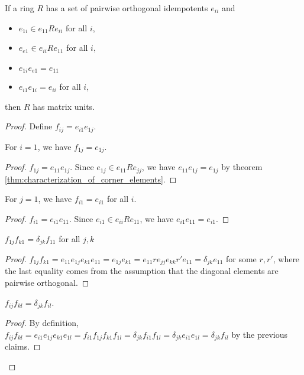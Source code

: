 \begin{theorem}
  \label{thm:criterion_for_matrix_units}
  \leanok
  If a ring $R$ has a set of pairwise orthogonal idempotents $e_{ii}$ and
  \begin{itemize}
    \item $e_{1i} \in e_{11}Re_{ii}$ for all $i$,
    \item $e_{e1} \in e_{ii}Re_{11}$ for all $i$, %
    \item $e_{1i}e_{e1} = e_{11}$ %
    \item $e_{i1}e_{1i} = e_{ii}$ for all $i$,
  \end{itemize}
  then $R$ has matrix units.
\end{theorem}
\begin{proof}
  \leanok
  Define $f_{ij} = e_{i1}e_{1j}$.

  \begin{claim}
    For $i = 1$, we have $f_{1j} = e_{1j}$.
  \end{claim}
  \begin{proof}
    \leanok
    $f_{1j} = e_{11}e_{1j}$. Since $e_{1j} \in e_{11}Re_{jj}$, we have $e_{11}e_{1j} = e_{1j}$ by theorem \ref{thm:characterization_of_corner_elements}.
  \end{proof}
  \begin{claim}
    For $j = 1$, we have $f_{i1} = e_{i1}$ for all $i$.
  \end{claim}
  \begin{proof}
    \leanok
    $f_{i1} = e_{i1}e_{11}$. Since $e_{i1} \in e_{ii}Re_{11}$, we have $e_{i1}e_{11} = e_{i1}$.
  \end{proof}
  \begin{claim}
    $f_{1j} f_{k1} = \delta_{jk} f_{11}$ for all $j, k$
  \end{claim}
  \begin{proof}
    \leanok
    $f_{1j} f_{k1} = e_{11}e_{1j}e_{k1}e_{11} = e_{1j}e_{k1} = e_{11} r e_{jj} e_{kk} r' e_{11} = \delta_{jk} e_{11}$ for some $r, r'$, where the last equality comes from the assumption that the diagonal elements are pairwise orthogonal.
  \end{proof}

  \begin{claim}
    $f_{ij} f_{kl} = \delta_{jk} f_{il}$.
  \end{claim}
  \begin{proof}
    \leanok
    By definition, $f_{ij} f_{kl} = e_{i1}e_{1j} e_{k1}e_{1l} = f_{i1}f_{1j} f_{k1}f_{1l} = \delta_{jk} f_{i1} f_{1l} = \delta_{jk} e_{i1} e_{1l} = \delta_{jk} f_{il}$ by the previous claims.
  \end{proof}
\end{proof}


